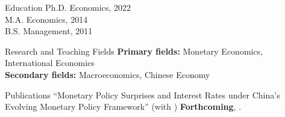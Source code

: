 \documentclass{resume_liang} %
\begin{document}
\begin{rSection}{Education}
Ph.D. Economics, {\bf \href{https://www.albany.edu/economics}{\color{black}{University at Albany, SUNY}}}  \hfill {2022} 
\vspace{0.1cm} \\             
M.A. Economics, {\bf \href{http://en.cufe.edu.cn/}{\color{black}{Central University of Finance and Economics}}} \hfill {2014} 
\vspace{0.1cm} \\
B.S. Management, {\bf \href{https://english.qdu.edu.cn/}{\color{black}{Qingdao University}}} \hfill {2011} 
\vspace{0.1cm} \\
\end{rSection}
\bigskip  




\begin{rSection}{Research and Teaching Fields}
{\bf Primary fields:} Monetary Economics, International Economics 
\vspace{0.1cm} \\ 
{\bf Secondary fields:} Macroeconomics, Chinese Economy 
\vspace{0.1cm} \\ 
\end{rSection}
\bigskip  




\begin{rSection}{Publications}
``Monetary Policy Surprises and Interest Rates under China's Evolving Monetary Policy Framework'' (with \href{https://sites.google.com/site/chunyuho}{\color{black}{Chun-Yu Ho}}) \textbf{Forthcoming}, \textit{}.
\vspace{0.1cm} \\
\end{rSection}
\bigskip  
\end{document}
